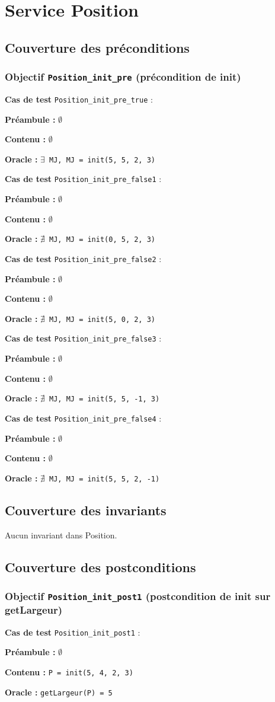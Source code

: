 \documentclass{article}
\newcommand{\cmd}[1]{\texttt{#1}}
\newcommand{\lEXISTS}{$\exists$}
\newcommand{\lNEXISTS}{$\nexists{}$}
\newcommand{\obj}[2]{\subsubsection*{\large{\textbf{Objectif {\cmd{#1} (#2)}}}}}
\newenvironment{cas}[1]
{
	\hspace{1em}\textbf{Cas de test} \cmd{#1} :
	\begin{list}{}{}
}{
	\end{list}\vspace{1em}
}
\newcommand{\npre}{\item \textbf{Préambule :} $\emptyset$}
\newcommand{\ope}[1]{\item \textbf{Contenu :} \cmd{#1}}
\newcommand{\nope}{\item \textbf{Contenu :} $\emptyset$}
\newcommand{\ora}[1]{\item \textbf{Oracle :} \cmd{#1}}
\begin{document}
\section{Service Position}

\subsection*{Couverture des préconditions}

\obj{Position\_init\_pre} {précondition de init}

	\begin{cas}{Position\_init\_pre\_true}
		\npre{}
		\nope{}
		\ora{\lEXISTS{} MJ, MJ = init(5, 5, 2, 3)}
	\end{cas}

	\begin{cas}{Position\_init\_pre\_false1}
		\npre{}
		\nope{}
		\ora{\lNEXISTS{} MJ, MJ = init(0, 5, 2, 3)}
	\end{cas}

	\begin{cas}{Position\_init\_pre\_false2}
		\npre{}
		\nope{}
		\ora{\lNEXISTS{} MJ, MJ = init(5, 0, 2, 3)}
	\end{cas}

	\begin{cas}{Position\_init\_pre\_false3}
		\npre{}
		\nope{}
		\ora{\lNEXISTS{} MJ, MJ = init(5, 5, -1, 3)}
	\end{cas}

	\begin{cas}{Position\_init\_pre\_false4}
		\npre{}
		\nope{}
		\ora{\lNEXISTS{} MJ, MJ = init(5, 5, 2, -1)}
	\end{cas}


\subsection*{Couverture des invariants}

Aucun invariant dans Position.

\subsection*{Couverture des postconditions}

\obj{Position\_init\_post1} {postcondition de init sur getLargeur}
	\begin{cas} {Position\_init\_post1}
		\npre{}
		\ope{P = init(5, 4, 2, 3)}
		\ora{getLargeur(P) = 5}
	\end{cas}
\end{document}
